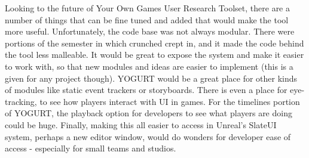 \documentclass[journal]{IEEEtran}
\begin{document}
Looking to the future of Your Own Games User Research Toolset, there are a number of things that can be fine tuned and added that would make the tool more useful. Unfortunately, the code base was not always modular. There were portions of the semester in which crunched crept in, and it made the code behind the tool less malleable. It would be great to expose the system and make it easier to work with, so that new modules and ideas are easier to implement (this is a given for any project though). YOGURT would be a great place for other kinds of modules like static event trackers or storyboards. There is even a place for eye-tracking, to see how players interact with UI in games. For the timelines portion of YOGURT, the playback option for developers to see what players are doing could be huge. Finally, making this all easier to access in Unreal’s SlateUI system, perhaps a new editor window, would do wonders for developer ease of access - especially for small teams and studios.


%
%

\end{document}
